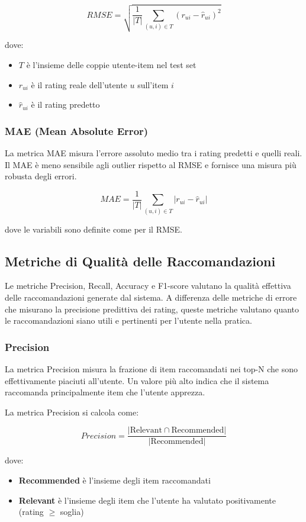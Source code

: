 \[
RMSE = \sqrt{ \frac{1}{|T|} \sum_{(u,i) \in T} (r_{ui} - \hat{r}_{ui})^2 }
\]

dove:
\begin{itemize}
    \item $T$ è l’insieme delle coppie utente-item nel test set
    \item $r_{ui}$ è il rating reale dell’utente $u$ sull’item $i$
    \item $\hat{r}_{ui}$ è il rating predetto
\end{itemize}

\subsubsection{MAE (Mean Absolute Error)}
La metrica MAE misura l'errore assoluto medio tra i rating predetti e quelli reali. Il MAE è meno sensibile agli outlier rispetto al RMSE e fornisce una misura più robusta degli errori.

\[
MAE = \frac{1}{|T|} \sum_{(u,i) \in T} \left| r_{ui} - \hat{r}_{ui} \right|
\]

dove le variabili sono definite come per il RMSE.

\subsection{Metriche di Qualità delle Raccomandazioni}

Le metriche Precision, Recall, Accuracy e F1-score valutano la qualità effettiva delle raccomandazioni generate dal sistema. A differenza delle metriche di errore che misurano la precisione predittiva dei rating, queste metriche valutano quanto le raccomandazioni siano utili e pertinenti per l'utente nella pratica.

\subsubsection{Precision}
La metrica Precision misura la frazione di item raccomandati nei top-N che sono effettivamente piaciuti all'utente. Un valore più alto indica che il sistema raccomanda principalmente item che l'utente apprezza.

La metrica Precision si calcola come:

\[
Precision = \frac{|\text{Relevant} \cap \text{Recommended}|}{|\text{Recommended}|}
\]

dove:
\begin{itemize}
    \item \textbf{Recommended} è l’insieme degli item raccomandati
    \item \textbf{Relevant} è l’insieme degli item che l’utente ha valutato positivamente (rating $\geq$ soglia)
\end{itemize}

